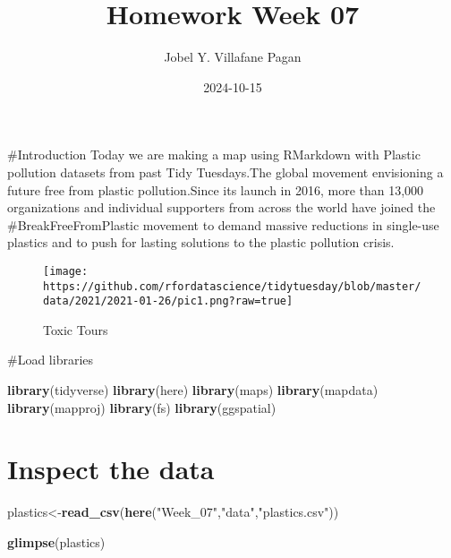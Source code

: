\documentclass[
]{article}
\title{Homework Week 07}
\author{Jobel Y. Villafane Pagan}
\date{2024-10-15}
\newenvironment{Shaded}{\begin{snugshade}}{\end{snugshade}}
\newcommand{\FunctionTok}[1]{\textcolor[rgb]{0.13,0.29,0.53}{\textbf{#1}}}
\newcommand{\NormalTok}[1]{#1}
\newcommand{\OtherTok}[1]{\textcolor[rgb]{0.56,0.35,0.01}{#1}}
\newcommand{\StringTok}[1]{\textcolor[rgb]{0.31,0.60,0.02}{#1}}
\begin{document}
\maketitle

\#Introduction Today we are making a map using RMarkdown with Plastic
pollution datasets from past Tidy Tuesdays.The global movement
envisioning a future free from plastic pollution.Since its launch in
2016, more than 13,000 organizations and individual supporters from
across the world have joined the \#BreakFreeFromPlastic movement to
demand massive reductions in single-use plastics and to push for lasting
solutions to the plastic pollution crisis.

\begin{figure}
\centering
\texttt{[image: https://github.com/rfordatascience/tidytuesday/blob/master/data/2021/2021-01-26/pic1.png?raw=true]}
\caption{Toxic Tours}
\end{figure}

\#Load libraries

\begin{Shaded}
\begin{Highlighting}[]
\FunctionTok{library}\NormalTok{(tidyverse)}
\FunctionTok{library}\NormalTok{(here)}
\FunctionTok{library}\NormalTok{(maps)}
\FunctionTok{library}\NormalTok{(mapdata)}
\FunctionTok{library}\NormalTok{(mapproj)}
\FunctionTok{library}\NormalTok{(fs)}
\FunctionTok{library}\NormalTok{(ggspatial)}
\end{Highlighting}
\end{Shaded}

\section{Inspect the data}\label{inspect-the-data}

\begin{Shaded}
\begin{Highlighting}[]
\NormalTok{plastics}\OtherTok{\textless{}{-}}\FunctionTok{read\_csv}\NormalTok{(}\FunctionTok{here}\NormalTok{(}\StringTok{"Week\_07"}\NormalTok{,}\StringTok{"data"}\NormalTok{,}\StringTok{"plastics.csv"}\NormalTok{))}

\FunctionTok{glimpse}\NormalTok{(plastics)}
\end{Highlighting}
\end{Shaded}
\end{document}
